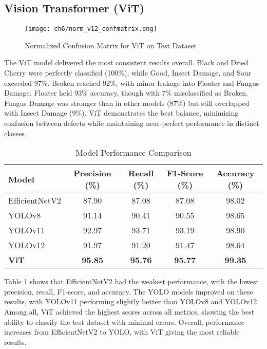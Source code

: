 \subsection{Vision Transformer (ViT)}

\begin{figure}[H]
    \centering
    \texttt{[image: ch6/norm\_v12\_confmatrix.png]} %
    \caption{Normalized Confusion Matrix for ViT on Test Dataset}
    \label{fig:vit_conf_matrix}
\end{figure}

The ViT model delivered the most consistent results overall. Black and Dried Cherry were perfectly classified (100\%), while Good, Insect Damage, and Sour exceeded 97\%. Broken reached 92\%, with minor leakage into Floater and Fungus Damage. Floater held 93\% accuracy, though with 7\% misclassified as Broken. Fungus Damage was stronger than in other models (87\%) but still overlapped with Insect Damage (9\%). ViT demonstrates the best balance, minimizing confusion between defects while maintaining near-perfect performance in distinct classes.

\begin{table}[ht]
	\centering
	\caption{Model Performance Comparison}
	\label{tab:model_performance}
	\begin{tabular}{l c c c c}
	\toprule
	\textbf{Model} & \textbf{Precision (\%)} & \textbf{Recall (\%)} & \textbf{F1-Score (\%)} & \textbf{Accuracy (\%)} \\
	\midrule
	EfficientNetV2 & 87.90 & 87.08 & 87.08 & 98.02 \\
	YOLOv8        & 91.14 & 90.41 & 90.55 & 98.65 \\
	YOLOv11       & 92.97 & 93.71 & 93.19 & 98.90 \\
	YOLOv12       & 91.97 & 91.20 & 91.47 & 98.64 \\
	\textbf{ViT}  & \textbf{95.85} & \textbf{95.76} & \textbf{95.77} & \textbf{99.35} \\
	\bottomrule
	\end{tabular}
\end{table}

Table \ref{tab:model_performance} shows that EfficientNetV2 had the weakest performance, with the lowest precision, recall, F1-score, and accuracy. The YOLO models improved on these results, with YOLOv11 performing slightly better than YOLOv8 and YOLOv12. Among all, ViT achieved the highest scores across all metrics, showing the best ability to classify the test dataset with minimal errors. Overall, performance increases from EfficientNetV2 to YOLO, with ViT giving the most reliable results.

